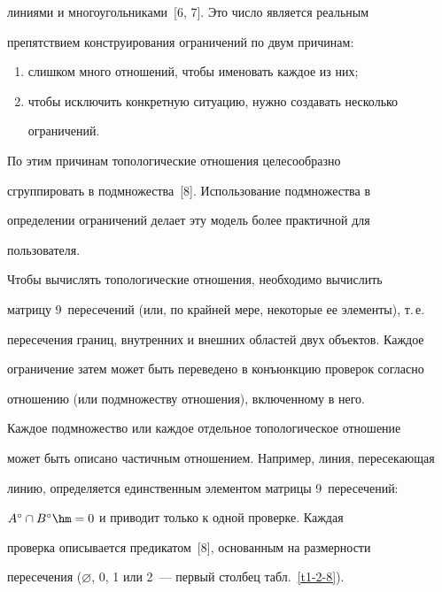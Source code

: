 линиями и многоугольниками~[6, 7]. Это число является реальным 


препятствием конструирования ограничений по двум причинам: 


     \begin{enumerate}[(1)]


\item слишком много отношений, чтобы именовать каждое из них; 


\item чтобы исключить конкретную ситуацию, нужно создавать несколько 


ограничений. 


\end{enumerate}





    По этим причинам топологические отношения целесообразно 


сгруппировать в подмножества~[8]. Использование подмножества в 


определении ограничений делает эту модель более практичной для 


пользователя. 


    


    Чтобы вычислять топологические отношения, необходимо вычислить 


матрицу 9~пересечений (или, по крайней мере, некоторые ее элементы), т.\,е.\ 


пересечения границ, внутренних и внешних областей двух объектов. Каждое 


ограничение затем может быть переведено в конъюнкцию проверок согласно 


отношению (или подмножеству отношения), включенному в него. 


    


    Каждое подмножество или каждое отдельное топологическое отношение 


может быть описано частичным отношением. Например, линия, пересекающая 


линию, определяется единственным элементом матрицы  9~пересечений: 


%  


    $A^\circ\cap B^\circ\hm=0$  и приводит только к одной проверке. Каждая 


проверка описывается предикатом~[8], основанным на размерности 


пересечения ($\varnothing$, 0, 1 или 2~--- первый столбец табл.~\ref{t1-2-8}). 


